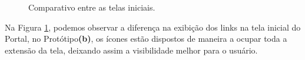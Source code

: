 \documentclass[12pt]{article}
\begin{document}
\begin{figure}[!htb]
  \caption{Comparativo entre as telas iniciais.}
  \label{figura15}
\end{figure}
Na Figura \ref{figura15}, podemos observar a diferença na exibição dos links na tela inicial do Portal, no Protótipo\textbf{(b)}, os ícones estão dispostos de maneira a ocupar toda a extensão da tela, deixando assim a visibilidade melhor para o usuário.
\end{document}

